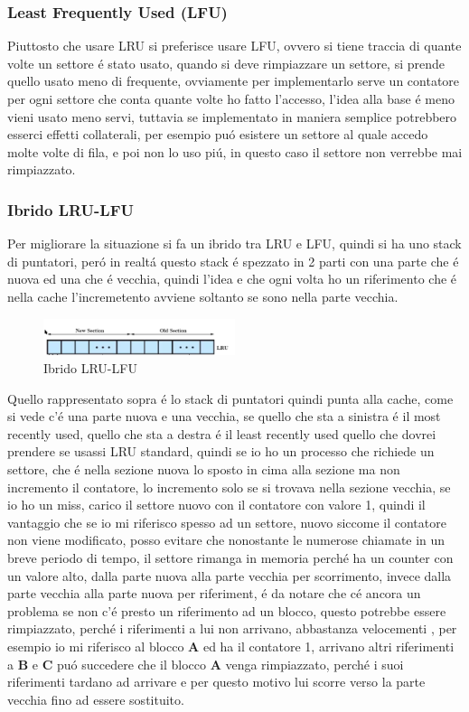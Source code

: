 \subsubsection*{Least Frequently Used (LFU)}
Piuttosto che usare LRU si preferisce usare LFU, ovvero si tiene traccia di quante volte un settore é stato usato,
quando si deve rimpiazzare un settore, si prende quello usato meno di frequente, ovviamente per implementarlo serve un contatore
per ogni settore che conta quante volte ho fatto l'accesso, l'idea alla base é meno vieni usato meno servi, tuttavia se implementato
in maniera semplice potrebbero esserci effetti collaterali, per esempio puó esistere un settore al quale accedo molte volte
di fila, e poi non lo uso piú, in questo caso il settore non verrebbe mai rimpiazzato.
\subsubsection*{Ibrido LRU-LFU}
Per migliorare la situazione si fa un ibrido tra LRU e LFU, quindi si ha uno stack di puntatori, peró in realtá questo stack
é spezzato in 2 parti con una parte che é nuova ed una che é vecchia, quindi l'idea e che ogni volta ho un riferimento che é nella cache
l'incremetento avviene soltanto se sono nella parte vecchia.
\begin{figure}[H]
    \centering
    \includegraphics[width=0.5\textwidth]{immagini/IbridoLRU-LFU}
    \caption{Ibrido LRU-LFU}
\end{figure}
Quello rappresentato sopra é lo stack di puntatori quindi punta alla cache, come si vede c'é una parte
nuova e una vecchia, se quello che sta a sinistra é il most recently used, quello che sta a destra é il least recently used
quello che dovrei prendere se usassi LRU standard, quindi se io ho un processo che richiede un settore, che é nella sezione
nuova lo sposto in cima alla sezione ma non incremento il contatore, lo incremento solo se si trovava nella sezione vecchia,
se io ho un miss, carico il settore nuovo con il contatore con valore 1, quindi il vantaggio che se io mi riferisco spesso
ad un settore, nuovo siccome il contatore non viene modificato, posso evitare che nonostante le numerose chiamate in un breve
periodo di tempo, il settore rimanga in memoria perché ha un counter con un valore alto, dalla parte nuova alla parte vecchia
per scorrimento, invece dalla parte vecchia alla parte nuova per riferiment, é da notare che cé ancora un problema se non c'é
presto un riferimento ad un blocco, questo potrebbe essere rimpiazzato, perché i riferimenti a lui non arrivano, abbastanza velocementi
, per esempio io mi riferisco al blocco \textbf{A} ed ha il contatore 1, arrivano altri riferimenti a \textbf{B} e \textbf{C} \ldotsecc
puó succedere che il blocco \textbf{A} venga rimpiazzato, perché i suoi riferimenti tardano ad arrivare e per questo
motivo lui scorre verso la parte vecchia fino ad essere sostituito.
